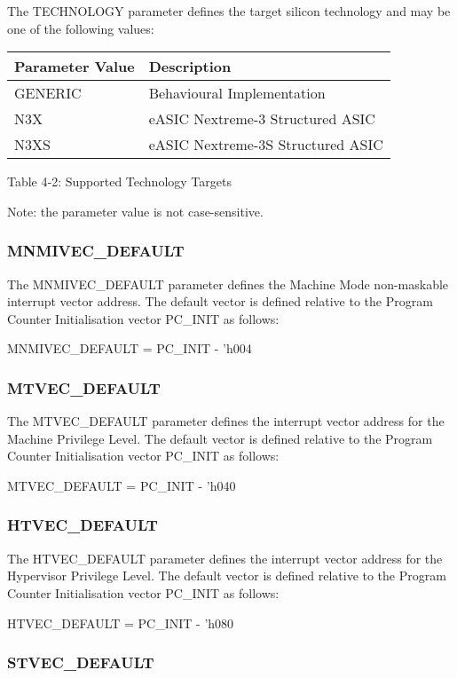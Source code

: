 The TECHNOLOGY parameter defines the target silicon technology and may
be one of the following values:

\begin{longtable}[]{@{}ll@{}}
\toprule
Parameter Value & Description\tabularnewline
\midrule
\endhead
GENERIC & Behavioural Implementation\tabularnewline
N3X & eASIC Nextreme-3 Structured ASIC\tabularnewline
N3XS & eASIC Nextreme-3S Structured ASIC\tabularnewline
\bottomrule
\end{longtable}

Table 4‑2: Supported Technology Targets

Note: the parameter value is not case-sensitive.

\subsubsection{MNMIVEC\_DEFAULT}\label{mnmivec_default}

The MNMIVEC\_DEFAULT parameter defines the Machine Mode non-maskable
interrupt vector address. The default vector is defined relative to the
Program Counter Initialisation vector PC\_INIT as follows:

MNMIVEC\_DEFAULT = PC\_INIT - 'h004

\subsubsection{MTVEC\_DEFAULT}\label{mtvec_default}

The MTVEC\_DEFAULT parameter defines the interrupt vector address for
the Machine Privilege Level. The default vector is defined relative to
the Program Counter Initialisation vector PC\_INIT as follows:

MTVEC\_DEFAULT = PC\_INIT - 'h040

\subsubsection{HTVEC\_DEFAULT}\label{htvec_default}

The HTVEC\_DEFAULT parameter defines the interrupt vector address for
the Hypervisor Privilege Level. The default vector is defined relative
to the Program Counter Initialisation vector PC\_INIT as follows:

HTVEC\_DEFAULT = PC\_INIT - 'h080

\subsubsection{STVEC\_DEFAULT}\label{stvec_default}

